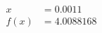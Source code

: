 \documentclass[preview]{standalone}
\begin{document}
\begin{align*}
x &= 0.0011\\f(x) &= 4.0088168
\end{align*}
\end{document}
